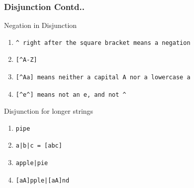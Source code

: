\documentclass[compress, black]{beamer}
\begin{document}
\begin{frame}[fragile]
  \frametitle{Disjunction Contd..}
  \begin{large_enum}
  \item[-]<1->Negation in Disjunction\\\normalsize
      \begin{enumerate}
      \item[-]<2-> \begin{verbatim}
^ right after the square bracket means a negation
\end{verbatim}
      \item[-]<3-> \begin{verbatim}
[^A-Z]
\end{verbatim}
      \item[-]<4-> \begin{verbatim}
[^Aa] means neither a capital A nor a lowercase a
\end{verbatim}
      \item[-]<5-> \begin{verbatim}
[^e^] means not an e, and not ^
\end{verbatim}
      \end{enumerate}
  \item[-]<6->Disjunction for longer strings\\\normalsize
      \begin{enumerate}
          \item[-]<7-> \begin{verbatim}
pipe
\end{verbatim}
        \item[-]<8-> \begin{verbatim}
a|b|c = [abc]
\end{verbatim}
        \item[-]<9-> \begin{verbatim}
apple|pie
\end{verbatim}
        \item[-]<10-> \begin{verbatim}
[aA]pple|[aA]nd
\end{verbatim}
      \end{enumerate}
  \end{large_enum}
\end{frame}
\end{document}
